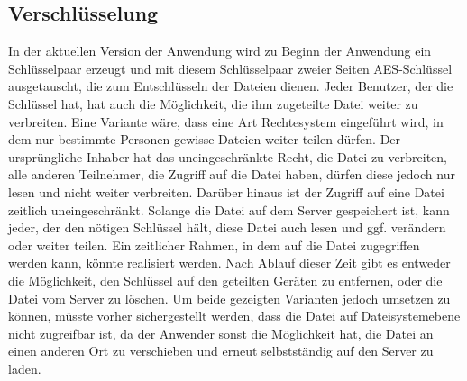 \documentclass[10pt, a4paper,headsepline,pointednumbers]{scrreprt}
\begin{document}
\subsection{Verschlüsselung}
In der aktuellen Version der Anwendung wird zu Beginn der Anwendung ein Schlüsselpaar erzeugt und mit diesem Schlüsselpaar zweier Seiten AES-Schlüssel ausgetauscht, die zum Entschlüsseln der Dateien dienen. Jeder Benutzer, der die Schlüssel hat, hat auch die Möglichkeit, die ihm zugeteilte Datei weiter zu verbreiten. Eine Variante wäre, dass eine Art Rechtesystem eingeführt wird, in dem nur bestimmte Personen gewisse Dateien weiter teilen dürfen. Der ursprüngliche Inhaber hat das uneingeschränkte Recht, die Datei zu verbreiten, alle anderen Teilnehmer, die Zugriff auf die Datei haben, dürfen diese jedoch nur lesen und nicht weiter verbreiten. Darüber hinaus ist der Zugriff auf eine Datei zeitlich uneingeschränkt. Solange die Datei auf dem Server gespeichert ist, kann jeder, der den nötigen Schlüssel hält, diese Datei auch lesen und ggf. verändern oder weiter teilen. Ein zeitlicher Rahmen, in dem auf die Datei zugegriffen werden kann, könnte realisiert werden. Nach Ablauf dieser Zeit gibt es entweder die Möglichkeit, den Schlüssel auf den geteilten Geräten zu entfernen, oder die Datei vom Server zu löschen. Um beide gezeigten Varianten jedoch umsetzen zu können, müsste vorher sichergestellt werden, dass die Datei auf Dateisystemebene nicht zugreifbar ist, da der Anwender sonst die Möglichkeit hat, die Datei an einen anderen Ort zu verschieben und erneut selbstständig auf den Server zu laden.
\end{document}
